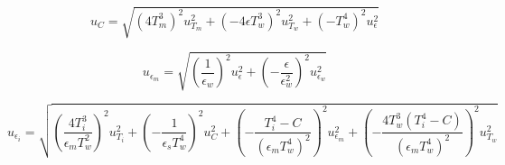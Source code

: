 \documentclass[10pt,a4paper,german]{article}
\begin{document}
\begin{equation}
    u_C = \sqrt{\left( 4 T_m^3 \right)^2 u_{T_m}^2 + \left( -4 \epsilon T_w^3 \right)^2 u_{T_w}^2 + \left( -T_w^4 \right)^2  u_{\epsilon}^2} 
\end{equation}

\begin{equation}
    u_{\epsilon_m} = \sqrt{ \left( \frac{1}{\epsilon_w} \right)^2 u_\epsilon^2 + \left( -\frac{\epsilon}{\epsilon_w^2} \right)^2 u_{\epsilon_w}^2}
\end{equation}

\begin{equation}
    u_{\epsilon_i} = \sqrt{ 
        \left( \frac{4 T_i^3}{\epsilon_m T_w^2} \right)^2 u_{T_i}^2 + 
        \left( -\frac{1}{\epsilon_s T_w^4} \right)^2 u_C^2 +
        \left( -\frac{T_i^4 - C}{\left( \epsilon_m T_w^4 \right)^2} \right)^2 u_{\epsilon_m}^2 +
        \left( -\frac{4 T_w^3 \left( T_i^4 - C \right)}{\left( \epsilon_m T_w^4 \right)^2} \right)^2 u_{T_w}^2
      }
\end{equation}
\end{document}
